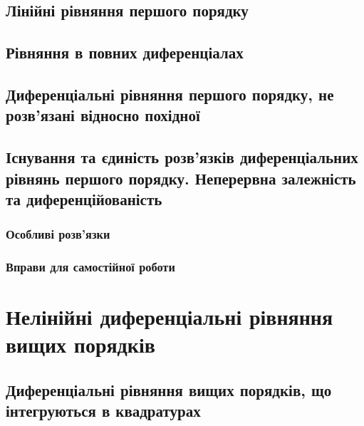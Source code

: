 \documentclass[a4paper, 12pt]{article}
\theoremstyle{definition}
\numberwithin{equation}{section}%
\numberwithin{equation}{subsection}
\begin{document}


\subsection{Лінійні рівняння першого порядку}



\subsection{Рівняння в повних диференціалах}



\subsection{Диференціальні рівняння першого порядку, не розв’язані відносно похідної}



\subsection{Існування та єдиність розв’язків диференціальних рівнянь першого порядку. Неперервна залежність та диференційованість}



\subsubsection{Особливі розв’язки}



\subsubsection{Вправи для самостійної роботи}



\section{Нелінійні диференціальні рівняння вищих порядків}



\subsection{Диференціальні рівняння вищих порядків, що інтегруються в квадратурах}


\end{document}
